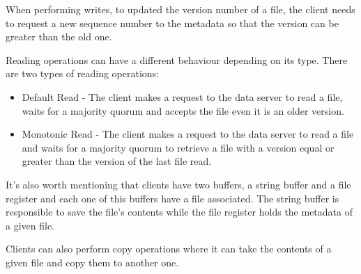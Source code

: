 When performing writes, to updated the version number of a file, the client needs to
request a new sequence number to the metadata so that the version can be greater
than the old one.

Reading operations can have a different behaviour depending on its type. There are
two types of reading operations: 

\begin{itemize}
\item Default Read - The client makes a request to the data server to read
a file, waits for a majority quorum and accepts the file even it is an
older version.

\item Monotonic Read - The client makes a request to the data server to read
a file and waits for a majority quorum to retrieve a file with a version equal or
greater than the version of the last file read.
\end{itemize}

It's also worth mentioning that clients have two buffers, a string buffer and a file
register and each one of this buffers have a file associated. The string buffer is
responsible to save the file's contents while the file register holds the metadata
of a given file.

Clients can also perform copy operations where it can take the contents of a
given file and copy them to another one.



